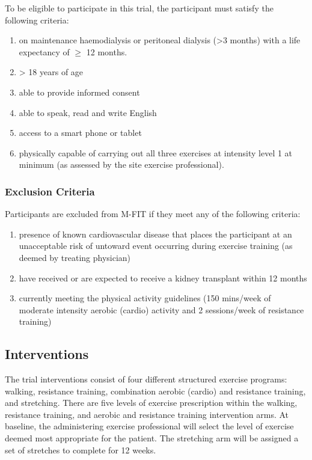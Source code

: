 \documentclass[
]{article}
\providecommand{\tightlist}{%
  \setlength{\itemsep}{0pt}\setlength{\parskip}{0pt}}
\begin{document}
To be eligible to participate in this trial, the participant must satisfy the following criteria:

\begin{enumerate}
  \def\labelenumi{\arabic{enumi}.}
  \tightlist
  \item on maintenance haemodialysis or peritoneal dialysis (>3 months) with a life expectancy of $\ge$ 12 months.
  \item > 18 years of age
  \item able to provide informed consent
  \item able to speak, read and write English
  \item access to a smart phone or tablet
  \item physically capable of carrying out all three exercises at intensity level 1 at minimum (as assessed by the site exercise professional).
\end{enumerate}

\hypertarget{exclusion-criteria}{
  \subsubsection{Exclusion Criteria}\label{exclusion-criteria}
}

Participants are excluded from M-FIT if they meet any of the following criteria:

\begin{enumerate}
  \def\labelenumi{\arabic{enumi}.}
  \tightlist
  \item presence of known cardiovascular disease that places the participant at an unacceptable risk of untoward event occurring during exercise training (as deemed by treating physician)
  \item have received or are expected to receive a kidney transplant within 12 months
  \item currently meeting the physical activity guidelines (150 mins/week of moderate intensity aerobic (cardio) activity and 2 sessions/week of resistance training)
\end{enumerate}


\hypertarget{interventions}{
  \subsection{Interventions}\label{interventions}
}

The trial interventions consist of four different structured exercise programs: walking, resistance training, combination aerobic (cardio) and resistance training, and stretching.
There are five levels of exercise prescription within the walking, resistance training, and aerobic and resistance training intervention arms.
At baseline, the administering exercise professional will select the level of exercise deemed most appropriate for the patient.
The stretching arm will be assigned a set of stretches to complete for 12 weeks.
\end{document}
